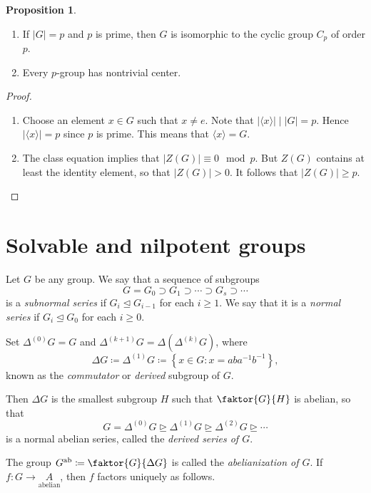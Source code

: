 \documentclass[10pt,letterpaper,cm]{nupset}
\theoremstyle{definition}
\theoremstyle{theorem}
\newtheorem{prop}[definition]{Proposition}
\theoremstyle{remark}
\newcommand{\1}{\mathbf{1}}
\newcommand{\0}{\vec 0}
\DeclareMathOperator{\ab}{ab}
\begin{document}
\begin{prop}  $ $
\begin{enumerate}
\item If $\lvert{G}\rvert = p$ and $p$ is prime, then $G$ is isomorphic to the cyclic group $C_p$ of order $p$.
\item Every $p$-group has nontrivial center.
\end{enumerate}
\end{prop}
\begin{proof} $ $
\begin{enumerate}
\item Choose an element $x\in G$ such that $x\ne e$. Note that $\lvert{\langle x\rangle}\rvert \mid \lvert{G}\rvert =p$. Hence $\lvert{\langle x\rangle}\rvert = p$ since $p$ is prime. This means that $\langle x\rangle = G$.
\item The class equation implies that $\lvert{Z(G)}\rvert \equiv 0 \mod p$. But $Z(G)$ contains at least the identity element, so that $\lvert{Z(G)}\rvert>0$. It follows that $\lvert{Z(G)}\rvert\geq p$.
\end{enumerate}
\end{proof}

\section{Solvable and nilpotent groups}

Let $G$ be any group.
We say that a sequence of subgroups $$  G= G_0 \supset G_1 \supset \cdots \supset G_s \supset \cdots    $$ is a \textit{subnormal series} if $G_i \unlhd G_{i-1}$ for each $i\geq 1$. We say that it is a \textit{normal series} if $G_i \unlhd G_0$ for each $i\geq 0$. 


\smallskip

Set $\Delta^{(0)}G =G$ and $\Delta^{(k+1)}G = \Delta(\Delta^{(k)}G)$, where $$\Delta G\coloneqq \Delta^{(1)} G \coloneqq \left\{x\in G : x =aba^{-1}b^{-1}\right\},$$ known as the \textit{commutator} or \textit{derived} subgroup of $G$.

\smallskip

Then $\Delta G$ is the smallest subgroup $H$ such that $\faktor{G}{H}$ is abelian, so that $$G = \Delta^{(0)}G \unrhd \Delta^{(1)}G \unrhd \Delta^{(2)}G \unrhd \cdots $$ is a normal abelian series, called the \textit{derived series of $G$}.

\smallskip

The group $G^{\ab}\coloneqq  \faktor{G}{\Delta G}$ is called the \textit{abelianization of $G$}.
If $f: G \to \underset{\text{abelian}} A$, then $f$ factors uniquely as follows.
\end{document}
